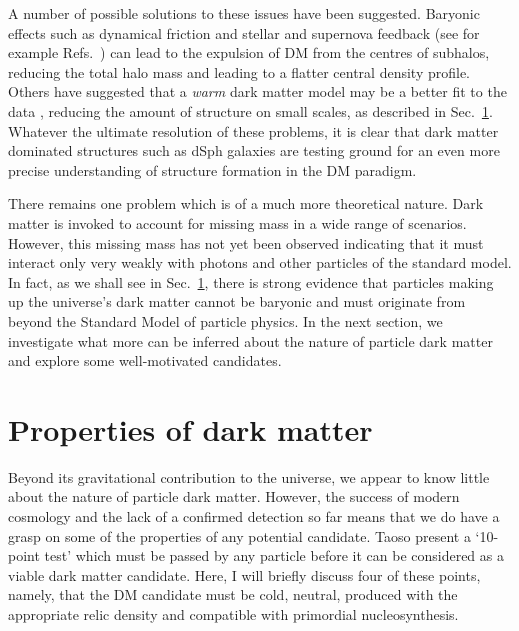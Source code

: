 A number of possible solutions to these issues have been suggested. Baryonic effects such as dynamical friction and stellar and supernova feedback (see for example Refs.~\cite{Gritschneder:2013, Amorisco:2014,DelPopolo:2014}) can lead to the expulsion of DM from the centres of subhalos, reducing the total halo mass and leading to a flatter central density profile.  Others have suggested that a \textit{warm} dark matter model may be a better fit to the data \cite{Moore:1999, Bode:2001, Maccio:2010}, reducing the amount of structure on small scales, as described in Sec.~\ref{intro:sec:properties}.  Whatever the ultimate resolution of these problems, it is clear that dark matter dominated structures such as dSph galaxies are testing ground for an even more precise understanding of structure formation in the DM paradigm.

There remains one problem which is of a much more theoretical nature. Dark matter is invoked to account for missing mass in a wide range of scenarios. However, this missing mass has not yet been observed indicating that it must interact only very weakly with photons and other particles of the standard model. In fact, as we shall see in Sec.~\ref{intro:sec:properties}, there is strong evidence that particles making up the universe's dark matter cannot be baryonic and must originate from beyond the Standard Model of particle physics. In the next section, we investigate what more can be inferred about the nature of particle dark matter and explore some well-motivated candidates.


\section{Properties of dark matter}
\label{intro:sec:properties}

Beyond its gravitational contribution to the universe, we appear to know little about the nature of particle dark matter. However, the success of modern cosmology and the lack of a confirmed detection so far means that we do have a grasp on some of the properties of any potential candidate. Taoso \etal \cite{Taoso:2008} present a `10-point test' which must be passed by any particle before it can be considered as a viable dark matter candidate. Here, I will briefly discuss four of these points, namely, that the DM candidate must be cold, neutral, produced with the appropriate relic density and compatible with primordial nucleosynthesis. 

